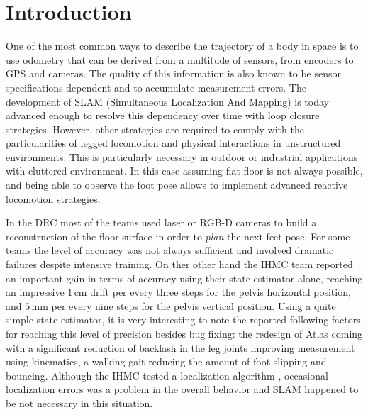 
\section{Introduction}\label{sec:intro}

One of the most common ways to describe the trajectory of a body in space is to use odometry that can be derived from a multitude of sensors, from encoders to GPS and cameras.
The quality of this information is also known to be sensor specifications dependent and to accumulate measurement errors. The development of SLAM (Simultaneous Localization And Mapping) is today advanced enough to resolve 
this dependency over time with loop closure strategies. However, other strategies are required to comply with the particularities of legged locomotion and physical interactions in unstructured environments. 
This is particularly necessary in outdoor or industrial applications with cluttered environment. 
In this case assuming flat floor is not always possible, and being able to observe the foot pose allows to implement advanced
reactive locomotion strategies.

In the DRC \cite{Johnson:jof:2016,Marion:jof:2017,Karumanchi:jof:2017} most of the teams used laser or RGB-D cameras to build a reconstruction of the floor surface in order to \emph{plan}
the next feet pose. For some teams the level of accuracy was not always sufficient and involved dramatic failures \cite{Kaneko:ichr:2015}
despite intensive training.
On ther other hand the IHMC team \cite{Johnson:jof:2016} reported an important gain in terms of accuracy using their state estimator alone,
reaching an impressive $1$\,cm drift per every three steps for the pelvis horizontal position,
and $5$\,mm per every nine steps for the pelvis vertical position. Using a quite simple state estimator,
it is very interesting to note the reported following factors for reaching this level of precision besides bug fixing:
the redesign of Atlas coming with a significant reduction of backlash in the leg joints improving measurement
using kinematics, a walking gait reducing the amount of foot slipping and bouncing.
Although the IHMC tested a localization algorithm \cite{Pomerlau:ar:2013}, occasional localization errors was
a problem in the overall behavior and SLAM happened to be not necessary in this situation.

